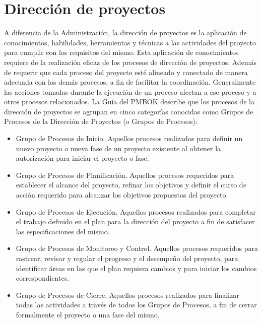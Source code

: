 \section{Dirección de proyectos}

A diferencia de la Administración, la dirección de proyectos es la aplicación de conocimientos, habilidades, herramientas y técnicas a las actividades del proyecto para cumplir con los requisitos del mismo. Esta aplicación de conocimientos requiere de la realización eficaz de los procesos de dirección de proyectos. Además de requerir que cada proceso del proyecto esté alineado y conectado de manera adecuada con los demás procesos, a fin de facilitar la coordinación. Generalmente las acciones tomadas durante la ejecución de un proceso afectan a ese proceso y a otros procesos relacionados.\cite{PMBOK}
\newline
La Guía del PMBOK describe que los procesos de la dirección de proyectos se agrupan en cinco categorías conocidas como Grupos de Procesos de la Dirección de Proyectos (o Grupos de Procesos): 
\begin{itemize}
\item Grupo de Procesos de Inicio. Aquellos procesos realizados para definir un nuevo proyecto o nueva fase de un proyecto existente al obtener la autorización para iniciar el proyecto o fase. 

\item Grupo de Procesos de Planificación. Aquellos procesos requeridos para establecer el alcance del proyecto, refinar los objetivos y definir el curso de acción requerido para alcanzar los objetivos propuestos del proyecto. 

\item Grupo de Procesos de Ejecución. Aquellos procesos realizados para completar el trabajo definido en el plan para la dirección del proyecto a fin de satisfacer las especificaciones del mismo. 

\item Grupo de Procesos de Monitoreo y Control. Aquellos procesos requeridos para rastrear, revisar y regular el progreso y el desempeño del proyecto, para identificar áreas en las que el plan requiera cambios y para iniciar los cambios correspondientes. 

\item Grupo de Procesos de Cierre. Aquellos procesos realizados para finalizar todas las actividades a través de todos los Grupos de Procesos, a fin de cerrar formalmente el proyecto o una fase del mismo.\cite{PMBOK}
\end{itemize}
 
